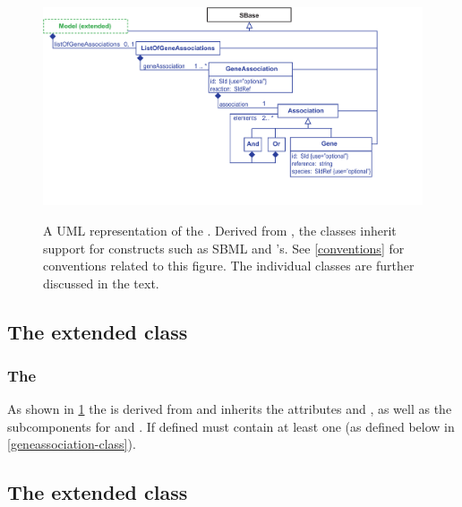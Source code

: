 \begin{figure}[h!]
  \centering
  \includegraphics[width=\textwidth]{images/fbc_uml_ga_all.pdf}\\
  \caption{A UML representation of the \FBCPackage. Derived from \SBase, the \FBC classes inherit support for constructs such as SBML \Notes and \Annotation's. See \ref{conventions} for conventions related to this figure. The individual classes are further discussed in the text.}
  \label{fig:fbc_uml_ga_all}
\end{figure}

\subsection{The extended  class}
\label{listofgeneassociations-class}

\subsubsection{The \FBC {}}

As shown in \ref{fig:fbc_uml_ga_all} the \ListOfGeneAssociations is derived from \SBase and inherits the attributes  and , as well as the subcomponents for \Annotation and \Notes. If defined \ListOfGeneAssociations must contain at least one \GeneAssociation (as defined below in \ref{geneassociation-class}).

\subsection{The extended  class}
\label{species-class-ga}

